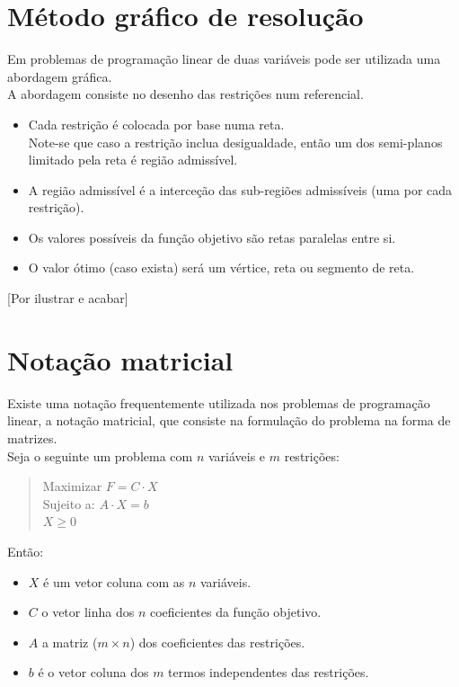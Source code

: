 \documentclass[]{report}
\begin{document}
\section{Método gráfico de resolução}
Em problemas de programação linear de duas variáveis pode ser utilizada uma abordagem gráfica.\\
A abordagem consiste no desenho das restrições num referencial.
\begin{itemize}
\item Cada restrição é colocada por base numa reta.\\
Note-se que caso a restrição inclua desigualdade, então um dos semi-planos limitado pela reta é região admissível.
\item A região admissível é a interceção das sub-regiões admissíveis (uma por cada restrição).
\item Os valores possíveis da função objetivo são retas paralelas entre si.
\item O valor ótimo (caso exista) será um vértice, reta ou segmento de reta.
\end{itemize}
[Por ilustrar e acabar]
\section{Notação matricial}
\begin{minipage}{\textwidth}
Existe uma notação frequentemente utilizada nos problemas de programação linear, a notação matricial, que consiste na formulação do problema na forma de matrizes.\\[0.5cm]
Seja o seguinte um problema com $n$ variáveis e $m$ restrições:
\begin{quotation}
\noindent Maximizar $F=C \cdot X$\\
Sujeito a: $A \cdot X = b$\\
\indent\indent\indent $X \geq 0$
\end{quotation}
Então:
\begin{itemize}
\item $X$ é um vetor coluna com as $n$ variáveis.
\item $C$ o vetor linha dos $n$ coeficientes da função objetivo.
\item $A$ a matriz ($m \times n$) dos coeficientes das restrições.
\item $b$ é o vetor coluna dos $m$ termos independentes das restrições.
\end{itemize}
\end{minipage}
\end{document}
